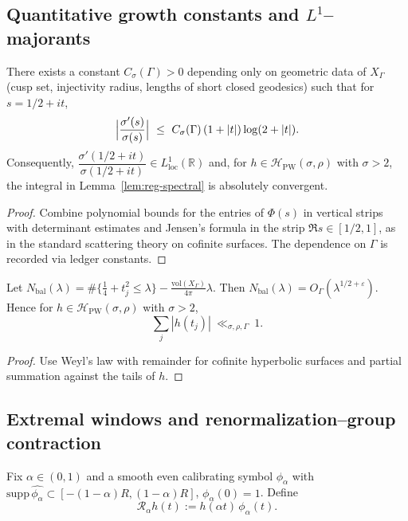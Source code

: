 \subsection{Quantitative growth constants and $L^1$–majorants}
\label{subsec:ch6-part1-growth} \relax \hspace{0pt}
\begin{lemma}
\label{lem:sigma-growth}
There exists a constant $C_\sigma(\Gamma)>0$ depending only on geometric data of $X_\Gamma$ (cusp set, injectivity radius, lengths of short closed geodesics) such that for $s=1/2+it$,
\[
\Bigl|\frac{\sigma'(s)}{\sigma(s)}\Bigr|\ \le\ C_\sigma(\Gamma)\,(1+|t|)\log(2+|t|).
\]
Consequently, $\dfrac{\sigma'(1/2+it)}{\sigma(1/2+it)}\in L^1_{\mathrm{loc}}(\mathbb R)$ and, for $h\in\mathcal H_{\mathrm{PW}}(\sigma,\rho)$ with $\sigma>2$, the integral in Lemma~\ref{lem:reg-spectral} is absolutely convergent.
\end{lemma}

\begin{proof}
Combine polynomial bounds for the entries of $\Phi(s)$ in vertical strips with determinant estimates and Jensen’s formula in the strip $\Re s\in[1/2,1]$, as in the standard scattering theory on cofinite surfaces. The dependence on $\Gamma$ is recorded via ledger constants. %
\end{proof}

\begin{lemma}
\label{lem:balanced-sum}
Let $N_{\mathrm{bal}}(\lambda)=\#\{\tfrac14+t_j^2\le \lambda\}-\tfrac{\mathrm{vol}(X_\Gamma)}{4\pi}\lambda$. Then $N_{\mathrm{bal}}(\lambda)=O_\Gamma(\lambda^{1/2+\varepsilon})$. Hence for $h\in\mathcal H_{\mathrm{PW}}(\sigma,\rho)$ with $\sigma>2$,
\[
\sum_j |h(t_j)| \ \ll_{\sigma,\rho,\Gamma}\ 1.
\]
\end{lemma}

\begin{proof}
Use Weyl’s law with remainder for cofinite hyperbolic surfaces and partial summation against the tails of $h$. %
\end{proof}


\subsection{Extremal windows and renormalization–group contraction}
\label{subsec:ch6-part1-RG} \relax \hspace{0pt}
\begin{definition}
\label{def:RG}
Fix $\alpha\in(0,1)$ and a smooth even calibrating symbol $\phi_\alpha$ with $\mathrm{supp}\,\widehat{\phi_\alpha}\subset[-(1-\alpha)R, (1-\alpha)R]$, $\phi_\alpha(0)=1$. Define
\[
\mathcal R_\alpha h(t):=h(\alpha t)\,\phi_\alpha(t).
\]
\end{definition}

